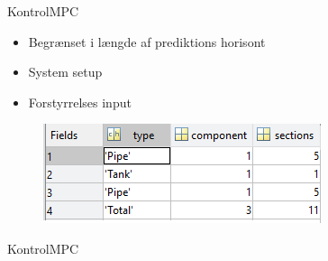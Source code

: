 \begin{frame}{Kontrol}{MPC}
  \vfill\vfill\centering



      \begin{minipage}[t]{0.48\linewidth}
    \begin{itemize}
    	\item Begrænset i længde af prediktions horisont
    	\item System setup
    	\item Forstyrrelses input
    \end{itemize}  
    \vspace{4mm}
    	 \begin{figure}
	 \centering
	 
	\label{fig:MPC_test_o}
	\end{figure}  
\end{minipage}\hfill
\begin{minipage}[t]{0.48\linewidth}
\begin{figure}[!h]
\centering
\includegraphics[width=0.97 \textwidth]{figures/mpc_system_setup}
\label{fig:mpc_system_setup}
\end{figure}

\end{minipage}


\vfill\vfill
\end{frame}

\begin{frame}{Kontrol}{MPC}
	\vfill\vfill \centering
	\vspace{-6mm}
	 \begin{figure}
	 \centering
	 
	\label{fig:MPC_test_output_first_test}
	\end{figure}   
	\vspace{-10mm}
	\begin{figure}
	 \centering
	 
	\label{fig:tank_height_first_test}
	\end{figure} 
	\vfill\vfill
\end{frame}


